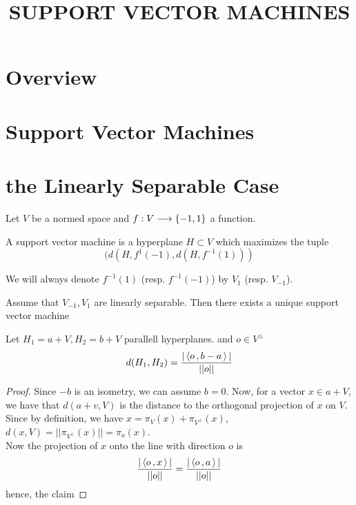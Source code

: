 


\title{SUPPORT VECTOR MACHINES}

\maketitle	


\noindent\hrulefill
\tableofcontents
\noindent\hrulefill

\label{section-phantom}

\section{Overview}
\section{Support Vector Machines}

\section{the Linearly Separable Case}


Let $V$ be a normed space and $f:V \longrightarrow \{-1,1\}$ a function. 
\begin{definition}
A support vector machine is a hyperplane $H \subset V$ which maximizes the tuple
\[
(d(H,f^{1}(-1),d(H,f^{-1}(1)))
\]	
\end{definition}

\begin{convention}
	We will always denote $f^{-1}(1)$ (resp. $f^{-1}(-1)$) by $V_1$ (resp. $V_{-1}$).
\end{convention}





\begin{theorem}
Assume that $V_{-1}, V_1	$ are linearly separable. Then there exists a unique support vector machine
\end{theorem}



\begin{lemma}
Let $H_1=a+V, H_2=b+V$ parallell hyperplanes. and $o \in V^{\perp}$
\[
d(H_1,H_2)=\frac{\vert \left\langle o\,,b-a\, \right\rangle\vert}{\vert\vert o\vert \vert}
\] 	
\end{lemma}

\begin{proof}
Since $-b$ is an isometry, we can assume $b=0$. Now, for a vector $x\in a+V$, we have that $d(a+v,V)$	 is the distance to the orthogonal projection of $x$ on $V$. Since by definition, we have $x=\pi_V(x)+\pi_{V^\perp}(x)$, $d(x,V)=\vert \vert \pi_{V^{\perp}}(x)\vert\vert=\pi_{o}(x)$.\\
Now the projection of $x$ onto the line with direction $o$ is
\[
\frac{\vert \left\langle o\,,x\, \right\rangle\vert}{\vert \vert o\vert \vert}=\frac{\vert \left\langle o\,,a\, \right\rangle\vert}{\vert \vert o\vert \vert}\]
hence, the claim
\end{proof}


